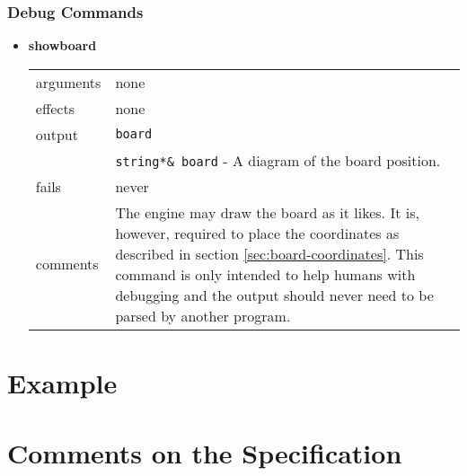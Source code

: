 \documentclass[a4paper]{article}
\begin{document}
\subsubsection{Debug Commands}
\begin{itemize}
\item \textbf{showboard} \\
  \begin{tabularx}{\linewidth}{lX}
    arguments &  none \\
    effects &    none \\
    output &     \texttt{board} \\
    & \texttt{string*\& board} - A diagram of the board position. \\
    fails &      never \\
    comments &   The engine may draw the board as it likes. It is,
                 however, required to place the coordinates as
                 described in section \ref{sec:board-coordinates}.
                 This command is only intended to help humans with
                 debugging and the output should never need to be
                 parsed by another program.
  \end{tabularx}
\end{itemize}

\newpage
\section{Example}

\newpage
\section{Comments on  the Specification}
\end{document}
